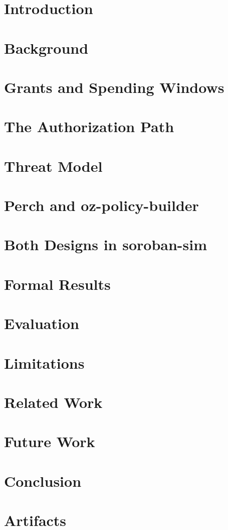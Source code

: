 \section{Introduction}\label{sec:motivation}

\section{Background}\label{sec:background}

\section{Grants and Spending Windows}\label{sec:grants}

\section{The Authorization Path}\label{sec:authorization}

\section{Threat Model}\label{sec:threat-model}

\section{Perch and oz-policy-builder}\label{sec:compare}

\section{Both Designs in soroban-sim}\label{sec:simulation}

\section{Formal Results}\label{sec:proofs}

\section{Evaluation}\label{sec:evaluation}

\section{Limitations}\label{sec:limits}

\section{Related Work}\label{sec:related}

\section{Future Work}\label{sec:agents}

\section{Conclusion}\label{sec:conclusion}

\appendix
\section{Artifacts}\label{sec:repro}

